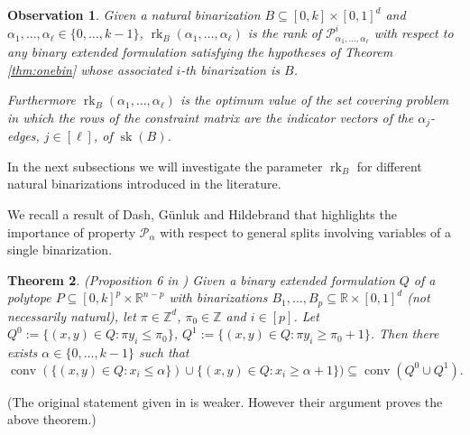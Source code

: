 \documentclass[11pt,a4paper]{article}
\newtheorem{theorem}{Theorem}[section]
\newtheorem{observation}[theorem]{Observation}
\renewcommand{\P}{\mathcal{P}}
\newcommand{\R}{\mathbb{R}}
\newcommand{\conv}{\operatorname{conv}}
\newcommand{\Z}{\mathbb{Z}}
\newcommand{\1}{\textbf{1}}
\newcommand{\rk}{\operatorname{rk}}
\newcommand{\sk}{\operatorname{sk}}
\newcommand\manuel[1]{\textcolor{LimeGreen}{\textbf{ MA:  #1}}}
\newcommand\michele[1]{\textcolor{blue}{\textbf{ MC:  #1}}}
\begin{document}
 \begin{observation}\label{obs:skeleton} 
 Given a natural binarization $B\subseteq [0,k]\times [0,1]^d$ and $\alpha_1,\dots,\alpha_\ell\in \{0,\dots,k-1\}$, $\rk_B(\alpha_1,\dots,\alpha_\ell)$ is the rank of $\mathcal{P}^i_{\alpha_1,\dots,\alpha_{\ell}}$ with respect to any binary extended formulation satisfying the hypotheses of Theorem \ref{thm:onebin} whose associated $i$-th binarization is $B$.
 
Furthermore $\rk_B(\alpha_1,\dots,\alpha_\ell)$  is the optimum value of the set covering problem in which the rows of the constraint matrix are the indicator vectors of the $\alpha_j$-edges,  $j\in[\ell]$, of $\sk(B)$. 
 \end{observation}

 
 
 In the next subsections we will investigate the parameter $\rk_B$ for different natural binarizations introduced in the literature. 



We recall a result of Dash, G\"unluk and Hildebrand \cite{dash2018binary} that highlights the importance of property $\mathcal{P}_{\alpha}$ with respect to general splits involving variables of a single binarization.

\begin{theorem}\label{thm:dash} (Proposition 6 in \cite{dash2018binary}) Given a binary extended formulation $Q$ of a polytope $P\subseteq [0,k]^p\times \R^{n-p}$ with binarizations $B_1,\dots,B_p\subseteq \R\times [0,1]^d$ (not necessarily natural), let $\pi\in \Z^d$, $\pi_0\in \Z$ and $i\in [p]$.
Let $Q^0:=\{(x,y)\in Q:\pi y_i\le \pi_0\}$, $Q^1:=\{(x,y)\in Q:\pi y_i\ge \pi_0+1\}$. Then there exists  $\alpha\in \{0,\dots,k-1\}$ such that
$$\conv(\{(x,y)\in Q:x_i\le \alpha\})\cup
\{(x,y)\in Q:x_i\ge \alpha+1\})\subseteq \conv (Q^0\cup Q^1).$$ 
\end{theorem}


(The original statement given in \cite{dash2018binary} is weaker. However their argument proves the above theorem.)
\end{document}
